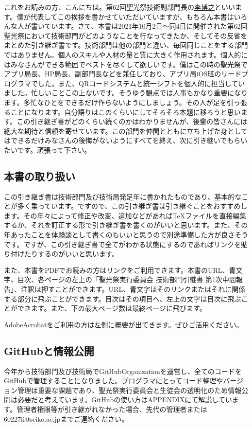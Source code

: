 \documentclass[dvipdfmx,jb5]{jarticle}
\newcommand{\mail}[2]{\href{mailto:#2}{#1}}
\begin{document}
これをお読みの方、こんにちは。第62回聖光祭技術副部門長の\mail{李博之}{60227li@seiko.ac.jp}といいます。僕が代表してこの挨拶を書かせていただいていますが、もちろん本書はいろんな人が書いています。さて、本書は2021年10月2日〜同4日に開催された第62回聖光祭において技術部門がどのようなことを行なってきたか、そしてその反省をまとめた引き継ぎ書です。技術部門は他の部門と違い、毎回同じことをする部門ではありません。個人のスキルや人材の量と質に大きく作用されます。個人的にはみなさんができる範囲でベストを尽くして欲しいです。僕はこの時の聖光祭でアプリ局長、HP局長、副部門長などを兼任しており、アプリ局iOS班のリードプログラマでした。また、QRコードシステムと統一シフトを個人的に担当していました。忙しいことこの上ないです。そうゆう観点では人事もかなり重要になります。多忙なひとをできるだけ作らないようにしましょう。その人が足を引っ張ることになります。自分語りはこのくらいにしてそろそろ本題に移ろうと思います。この引き継ぎ書がどのくらい続くのかはわかりませんが、後輩の皆さんには絶大な期待と信頼を寄せています。この部門を仲間とともに立ち上げた身としてはできるだけみなさんの後悔がないようにすべてを終え、次に引き継いでもらいたいです。頑張って下さい。
\subsection{本書の取り扱い}
この引き継ぎ書は技術部門及び技術局発足年に書かれたものであり、基本的なことが多く乗っています。ですので、この引き継ぎ書は引き継ぐことをおすすめします。その年々によって修正や改変、追加などがあれば\TeX ファイルを直接編集するか、それを訂正する形で引き継ぎ書を書くのがいいと思います。また、その年あったことを体験談として書くのもいいと思うので別途準備した方が良さそうです。ですが、この引き継ぎ書で全てがわかる状態にするのであればリンクを貼り付けたりするのがいいと思います。

また、本書をPDFでお読みの方はリンクをご利用できます。本書のURL、青文字、目次、各ページの左上の「聖光祭実行委員会 技術部門引継書 第1次中間報告」、注釈は押すことができます。URL、青文字はそのリンクまたはそれに関係する部分に飛ぶことができます。目次はその項目へ、左上の文字は目次に飛ぶことができます。また、下の最大ページ数は最終ページに飛びます。

AdobeAcrobatをご利用の方は左側に概要が出てきます。ぜひご活用ください。
\subsection{GitHubと情報公開}
今年から技術部門及び技術局でGitHubOrganizationを運営し、全てのコードをGitHubで管理することになりました。プログラマにとってコード整理やバージョン管理は重要な課題であり、聖光祭実行委員会と生徒会の透明化のため情報公開は必要だと考えています。GitHubの使い方はAPPENDIXにて解説しています。管理者権限等が引き継がれなかった場合、先代の管理者または {\ttfamily 60227li@seiko.ac.jp}までご連絡ください。
\end{document}
